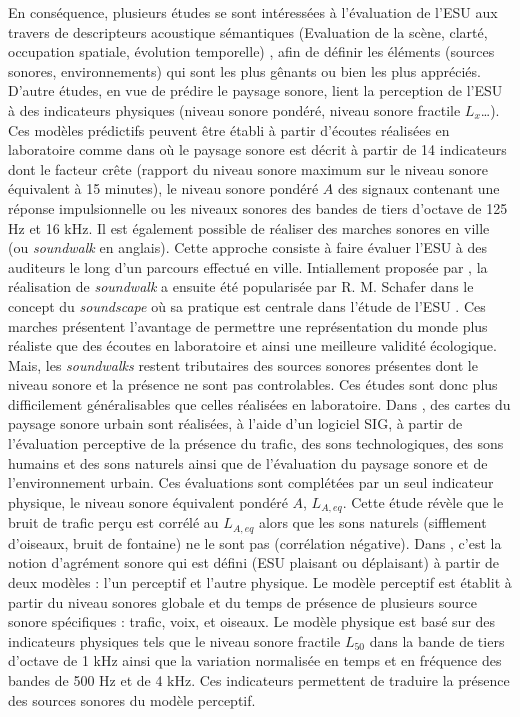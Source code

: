 En conséquence, plusieurs études se sont intéressées à l'évaluation de l'ESU aux travers de descripteurs acoustique sémantiques (Evaluation de la scène, clarté, occupation spatiale, évolution temporelle)  \cite{raimbault2003ambient,hall2013exploratory}, afin de définir les éléments (sources sonores, environnements) qui sont les plus gênants ou bien les plus appréciés. 
D'autre études, en vue de prédire le paysage sonore, lient la perception de l'ESU à des indicateurs physiques (niveau sonore pondéré, niveau sonore fractile $L_x$\dots). Ces modèles prédictifs peuvent être établi à partir d'écoutes réalisées en laboratoire comme dans \cite{torija2013application} où le paysage sonore est décrit à partir de 14 indicateurs dont le facteur crête (rapport du niveau sonore maximum sur le niveau sonore équivalent à 15 minutes), le niveau sonore pondéré $A$ des signaux contenant une réponse impulsionnelle ou les niveaux sonores des bandes de tiers d'octave de 125 Hz et 16 kHz.
Il est également possible de réaliser des marches sonores en ville (ou \textit{soundwalk} en anglais). Cette approche consiste à faire évaluer l'ESU à des auditeurs le long d'un parcours effectué en ville. Intiallement proposée par \cite{southworth1967sonic}, la réalisation de \textit{soundwalk} a ensuite été popularisée par R. M. Schafer dans le concept du \textit{soundscape} où sa pratique est centrale dans l'étude de l'ESU \cite{schafer1969new, schafer1977tuning}. Ces marches présentent l'avantage de permettre une représentation du monde plus réaliste que des écoutes en laboratoire et ainsi une meilleure validité écologique. Mais, les \textit{soundwalks} restent tributaires des sources sonores présentes dont le niveau sonore et la présence ne sont pas controlables. Ces études sont donc plus difficilement généralisables que celles réalisées en laboratoire. Dans \cite{hong2014soundscape}, des cartes du paysage sonore urbain sont réalisées, à l'aide d'un logiciel SIG, à partir de l'évaluation perceptive de la présence du trafic, des sons technologiques, des sons humains et des sons naturels ainsi que de l'évaluation du paysage sonore et de l'environnement urbain. Ces évaluations sont complétées par un seul indicateur physique, le niveau sonore équivalent pondéré $A$, $L_{A,eq}$. Cette étude révèle que le bruit de trafic perçu est corrélé au $L_{A,eq}$ alors que les sons naturels (sifflement d'oiseaux, bruit de fontaine) ne le sont pas (corrélation négative). Dans \cite{aumond2017modeling}, c'est la notion d'agrément sonore qui est défini (ESU plaisant ou déplaisant) à partir de deux modèles : l'un perceptif et l'autre physique. Le modèle perceptif est établit à partir du niveau sonores globale et du temps de présence de plusieurs source sonore spécifiques : trafic, voix, et oiseaux. Le modèle physique est basé sur des indicateurs physiques tels que le niveau sonore fractile $L_{50}$ dans la bande de tiers d'octave de 1 kHz ainsi que la variation normalisée en temps et en fréquence des bandes de 500 Hz et de 4 kHz. Ces indicateurs permettent de traduire la présence des sources sonores du modèle perceptif. 

